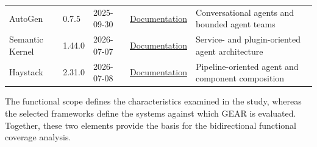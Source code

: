 \begin{table}[t]
\begin{tabular}{
        @{}
        p{}
        p{}
        p{}
        p{}
        p{}
        @{}
    }
        AutoGen
        & 0.7.5
        & 2025-09-30
        & \href{https://microsoft.github.io/autogen/stable/user-guide/agentchat-user-guide/index.html}
        {Documentation}
        & Conversational agents and bounded agent teams \\

        Semantic Kernel
        & 1.44.0
        & 2026-07-07
        & \href{https://learn.microsoft.com/en-us/semantic-kernel/frameworks/agent/}
        {Documentation}
        & Service- and plugin-oriented agent architecture \\

        Haystack
        & 2.31.0
        & 2026-07-08
        & \href{https://docs.haystack.deepset.ai/docs/intro}
        {Documentation}
        & Pipeline-oriented agent and component composition \\

        \bottomrule
    \end{tabular}
\end{table}

The functional scope defines the characteristics examined in the study,
whereas the selected frameworks define the systems against which GEAR is
evaluated. Together, these two elements provide the basis for the
bidirectional functional coverage analysis.
